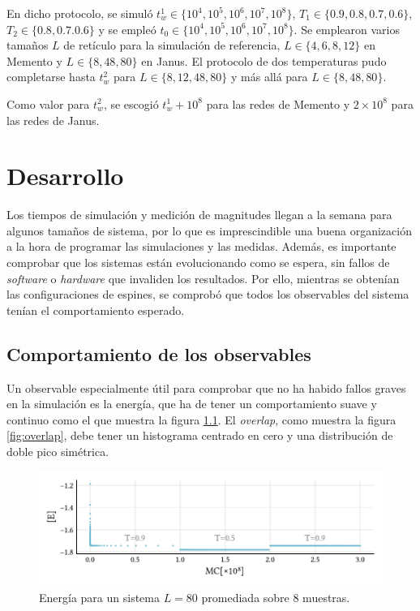 \documentclass[11pt]{report}
\begin{document}
En dicho protocolo, se simuló
$t_w^1 ∈\{10^4, 10^5, 10^6, 10^7, 10^8\}$,
$T_1∈\{0.9, 0.8, 0.7, 0.6\}$, $T_2∈\{0.8,0.7.0.6\}$ y se empleó
$t_0∈\{10^4, 10^5, 10^6, 10^7,10^8\}$. Se emplearon varios tamaños $L$
de retículo para la simulación de referencia, $L∈\{4,6,8,12\}$ en
Memento y $L∈\{8,48,80\}$ en Janus. El protocolo de dos temperaturas
pudo completarse hasta $t_w^2$ para $L∈\{8,12,48,80\}$ y más allá para
$L∈\{8,48,80\}$.

Como valor para $t_w^2$, se escogió $t_w^1 + 10^8$ para las redes de
Memento y $2×10^8$ para las redes de Janus.



\chapter{Desarrollo}

Los tiempos de simulación y medición de magnitudes llegan a la semana
para algunos tamaños de sistema, por lo que es imprescindible una
buena organización a la hora de programar las simulaciones y las
medidas. Además, es importante comprobar que los sistemas están
evolucionando como se espera, sin fallos de \textit{software} o
\textit{hardware} que invaliden los resultados. Por ello, mientras se
obtenían las configuraciones de espines, se comprobó que todos los
observables del sistema tenían el comportamiento esperado.

\section{Comportamiento de los observables}

Un observable especialmente útil para comprobar que no ha habido
fallos graves en la simulación es la energía, que ha de tener un
comportamiento suave y continuo como el que muestra la figura
\ref{fig:energyprotocol}. El \textit{overlap}, como muestra la figura
\ref{fig:overlap}, debe tener un histograma centrado en cero y una
distribución de doble pico simétrica.

\begin{figure}
  \centering
  \includegraphics{../study_cases/energy_in_protocol/energyprotocol.pdf}
  \caption{Energía para un sistema $L=80$ promediada sobre 8 muestras.}
  \label{fig:energyprotocol}
\end{figure}
\end{document}
